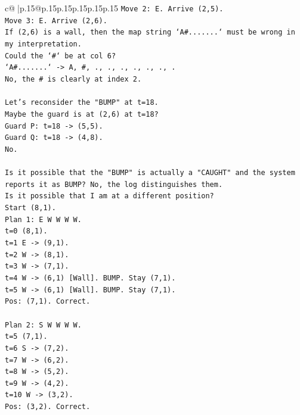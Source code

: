 \documentclass{article}
\begin{document}
{\begin{supertabular}{c@{$\;$}|p{.15\linewidth}@{}p{.15\linewidth}p{.15\linewidth}p{.15\linewidth}p{.15\linewidth}p{.15\linewidth}}
{{{\texttt{Move 2: E. Arrive (2,5).} \\
\texttt{Move 3: E. Arrive (2,6).} \\
\texttt{If (2,6) is a wall, then the map string `A\#.......` must be wrong in my interpretation.} \\
\texttt{Could the `\#` be at col 6?} \\
\texttt{`A\#.......` {-}> A, \#, ., ., ., ., ., ., .} \\
\texttt{No, the \# is clearly at index 2.} \\
\\ 
\texttt{Let's reconsider the "BUMP" at t=18.} \\
\texttt{Maybe the guard is at (2,6) at t=18?} \\
\texttt{Guard P: t=18 {-}> (5,5).} \\
\texttt{Guard Q: t=18 {-}> (4,8).} \\
\texttt{No.} \\
\\ 
\texttt{Is it possible that the "BUMP" is actually a "CAUGHT" and the system reports it as BUMP? No, the log distinguishes them.} \\
\texttt{Is it possible that I am at a different position?} \\
\texttt{Start (8,1).} \\
\texttt{Plan 1: E W W W W.} \\
\texttt{t=0 (8,1).} \\
\texttt{t=1 E {-}> (9,1).} \\
\texttt{t=2 W {-}> (8,1).} \\
\texttt{t=3 W {-}> (7,1).} \\
\texttt{t=4 W {-}> (6,1) {[}Wall{]}. BUMP. Stay (7,1).} \\
\texttt{t=5 W {-}> (6,1) {[}Wall{]}. BUMP. Stay (7,1).} \\
\texttt{Pos: (7,1). Correct.} \\
\\ 
\texttt{Plan 2: S W W W W.} \\
\texttt{t=5 (7,1).} \\
\texttt{t=6 S {-}> (7,2).} \\
\texttt{t=7 W {-}> (6,2).} \\
\texttt{t=8 W {-}> (5,2).} \\
\texttt{t=9 W {-}> (4,2).} \\
\texttt{t=10 W {-}> (3,2).} \\
\texttt{Pos: (3,2). Correct.} \\
\\ 
}}}
\end{supertabular}}
\end{document}
